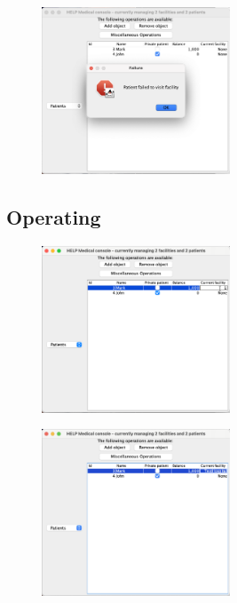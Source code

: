 \documentclass{article}
\begin{document}
\begin{figure}
  \begin{center}
    \includegraphics[width=0.5\textwidth]{./figures/Visit/Visit_4.png}
  \end{center}
\end{figure}

\subsection{Operating}\label{sub:operating} %
\begin{figure}
  \begin{center}
    \includegraphics[width=0.5\textwidth]{./figures/Operation/Operation_1.png}
  \end{center}
\end{figure}

\begin{figure}
  \begin{center}
    \includegraphics[width=0.5\textwidth]{./figures/Operation/Operation_2.png}
  \end{center}
\end{figure}
\end{document}
